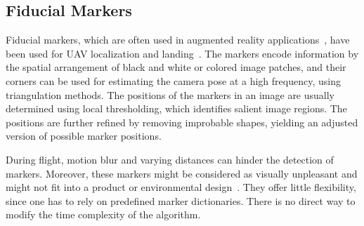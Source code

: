 \subsection{Fiducial Markers}
\label{sec:fiducialmarkers}

Fiducial markers, which are often used in augmented reality
applications~\cite{kato1999marker,garrido2014automatic}, have been
used for UAV localization and
landing~\cite{eberli2011vision,bebop2015}.
The markers encode information by the spatial arrangement of
black and white or colored image patches, and their corners can be
used for estimating the camera pose at a high frequency, using
triangulation methods. The positions of the markers in
an image are usually determined using local thresholding, which identifies salient image
regions. The positions are further refined by removing improbable shapes,
yielding an adjusted version of possible marker positions.

During flight, motion blur and varying distances can hinder the
detection of markers. Moreover, these markers might be considered as
visually unpleasant and might not fit into a product or environmental
design~\cite{chu2013halftone}. They offer little
flexibility, since one has to rely on predefined marker dictionaries.
There is no direct way to modify the time complexity of the algorithm.

